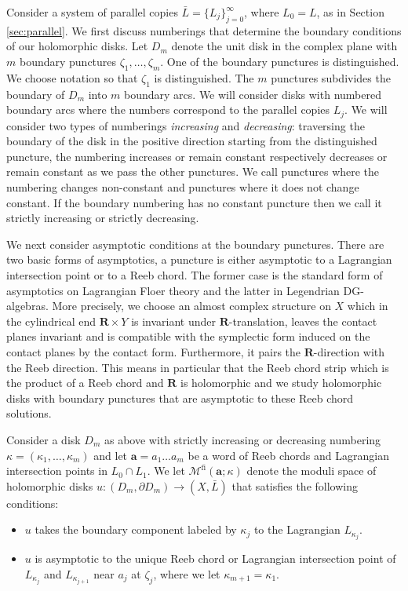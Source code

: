 \documentclass{gtpart}
\renewcommand{\R}{\mathbf{R}}
\newcommand{\fl}{\mathrm{fi}}
\begin{document}
Consider a system of parallel copies $\bar L=\{L_j\}_{j=0}^{\infty}$, where $L_0=L$, as in Section \ref{sec:parallel}. 
We first discuss numberings that determine the boundary conditions of our holomorphic disks.
Let $D_{m}$ denote the unit disk in the complex plane with $m$ boundary punctures
$\zeta_{1},\dots,\zeta_{m}$. One of the boundary punctures is distinguished. We choose notation so
that $\zeta_{1}$ is distinguished. The $m$ punctures subdivides the boundary of $D_{m}$ into $m$
boundary arcs. We will consider disks with numbered boundary arcs where the numbers correspond to
the parallel copies $L_{j}$. We will consider two types of numberings \emph{increasing} and
\emph{decreasing}: traversing the boundary of the disk in the positive direction starting from the
distinguished puncture, the numbering increases or remain constant respectively decreases or remain constant as we pass the other punctures. We call punctures where the numbering changes non-constant and punctures where it does not change constant. If the boundary numbering has no constant puncture then we call it strictly increasing or strictly decreasing. 

We next consider asymptotic conditions at the boundary punctures. There are two basic forms of asymptotics, a puncture is either asymptotic to a Lagrangian intersection point or to a Reeb chord. The former case is the standard form of asymptotics on Lagrangian Floer theory and the latter in Legendrian DG-algebras. More precisely, we choose an almost complex structure on $X$ which in the cylindrical end $\R\times Y$ is invariant under $\R$-translation, leaves the contact planes invariant and is compatible with the symplectic form induced on the contact planes by the contact form. Furthermore, it pairs the $\R$-direction with the Reeb direction. This means in particular that the Reeb chord strip which is the product of a Reeb chord and $\R$ is holomorphic and we study holomorphic disks with boundary punctures that are asymptotic to these Reeb chord solutions. 

Consider a disk $D_{m}$ as above with strictly increasing or decreasing numbering $\kappa=(\kappa_1,\dots,\kappa_{m})$ and let $\mathbf{a}=a_{1}\dots a_{m}$ be a word of Reeb chords and Lagrangian intersection points in $L_{0}\cap L_1$. We let $\mathcal{M}^{\fl}(\mathbf{a};\kappa)$ denote the moduli space of holomorphic disks $u\colon (D_{m},\partial D_{m})\to (X,\bar L)$ that satisfies the following conditions:
\begin{itemize}
\item $u$ takes the boundary component labeled by $\kappa_{j}$ to the Lagrangian $L_{\kappa_j}$.
\item $u$ is asymptotic to the unique Reeb chord or Lagrangian intersection point of $L_{\kappa_j}$ and $L_{\kappa_{j+1}}$ near $a_{j}$ at $\zeta_{j}$, where we let $\kappa_{m+1}=\kappa_{1}$.  	
\end{itemize} 
\end{document}
